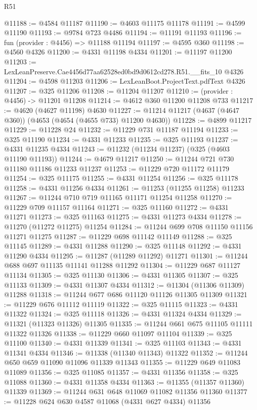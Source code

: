 \begin{lexlean}{R51}
\begin{coremodule}
@11188 := @4584 @11187
@11190 := @4603 @11175 @11178
@11191 := @4599 @11190
@11193 := @9784 @723 @4486
@11194 := @11191 @11193
@11196 := fun (provider : @4456) => @11188 @11194
@11197 := @4595 @360
@11198 := @4560 @4326
@11200 := @4331 @11198 @4334
@11201 := @11197 @11200
@11203 := LexLeanPreserve.Cae4456d77aa62528ed0bd9d0612cd278.R51.__fits_10 @4326
@11204 := @4598 @11203
@11206 := LexLeanBoot.ProjectText.pdfText @4326
@11207 := @325 @11206
@11208 := @11204 @11207
@11210 := (provider : @4456) -> @11201 @11208
@11214 := @4612 @360 @11200 @11208 @733
@11217 := @4620 (@4627 @11198) @4630
@11227 := @11214 @11217 (@4637 (@4647 @360)) (@4653 (@4654 (@4655 @733) @11200 @4630))
@11228 := @4899 @11217
@11229 := @11228 @24
@11232 := @11229 @731 @11187 @11194
@11233 := @325 @11190
@11234 := @4331 @11233
@11235 := @325 @11193
@11237 := @4331 @11235 @4334
@11243 := @11232 (@11234 @11237) (@325 (@4603 @11190 @11193))
@11244 := @4679 @11217
@11250 := @11244 @721 @730 @11180 @11186 @11233 @11237
@11253 := @11229 @720 @11172 @11179
@11254 := @325 @11175
@11255 := @4331 @11254
@11256 := @325 @11178
@11258 := @4331 @11256 @4334
@11261 := @11253 (@11255 @11258) @11233
@11267 := @11244 @710 @719 @11165 @11171 @11254 @11258
@11270 := @11229 @709 @11157 @11164
@11271 := @325 @11160
@11272 := @4331 @11271
@11273 := @325 @11163
@11275 := @4331 @11273 @4334
@11278 := @11270 (@11272 @11275) @11254
@11284 := @11244 @699 @708 @11150 @11156 @11271 @11275
@11287 := @11229 @698 @11142 @11149
@11288 := @325 @11145
@11289 := @4331 @11288
@11290 := @325 @11148
@11292 := @4331 @11290 @4334
@11295 := @11287 (@11289 @11292) @11271
@11301 := @11244 @688 @697 @11135 @11141 @11288 @11292
@11304 := @11229 @687 @11127 @11134
@11305 := @325 @11130
@11306 := @4331 @11305
@11307 := @325 @11133
@11309 := @4331 @11307 @4334
@11312 := @11304 (@11306 @11309) @11288
@11318 := @11244 @677 @686 @11120 @11126 @11305 @11309
@11321 := @11229 @676 @11112 @11119
@11322 := @325 @11115
@11323 := @4331 @11322
@11324 := @325 @11118
@11326 := @4331 @11324 @4334
@11329 := @11321 (@11323 @11326) @11305
@11335 := @11244 @661 @675 @11105 @11111 @11322 @11326
@11338 := @11229 @660 @11097 @11104
@11339 := @325 @11100
@11340 := @4331 @11339
@11341 := @325 @11103
@11343 := @4331 @11341 @4334
@11346 := @11338 (@11340 @11343) @11322
@11352 := @11244 @650 @659 @11090 @11096 @11339 @11343
@11355 := @11229 @649 @11083 @11089
@11356 := @325 @11085
@11357 := @4331 @11356
@11358 := @325 @11088
@11360 := @4331 @11358 @4334
@11363 := @11355 (@11357 @11360) @11339
@11369 := @11244 @631 @648 @11069 @11082 @11356 @11360
@11377 := @11228 @624 @630 @4587 @11068 (@4331 @627 @4334) @11356

\end{coremodule}
\end{lexlean}
